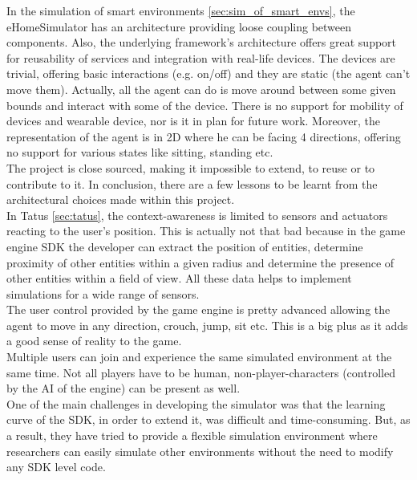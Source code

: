 In the simulation of smart environments \ref{sec:sim_of_smart_envs}, the eHomeSimulator has an architecture providing loose coupling between components. Also, the underlying framework's architecture offers great support for reusability of services and integration with real-life devices. The devices are trivial, offering basic interactions (e.g. on/off) and they are static (the agent can't move them). Actually, all the agent can do is move around between some given bounds and interact with some of the device. There is no support for mobility of devices and wearable device, nor is it in plan for future work. Moreover, the representation of the agent is in 2D where he can be facing 4 directions, offering no support for various states like sitting, standing etc.\\

The project is close sourced, making it impossible to extend, to reuse or to contribute to it. In conclusion, there are a few lessons to be learnt from the architectural choices made within this project.\\

In Tatus \ref{sec:tatus}, the context-awareness is limited to sensors and actuators reacting to the user's position. This is actually not that bad because in the game engine SDK the developer can extract the position of entities, determine proximity of other entities within a given radius and determine the presence of other entities within a field of view. All these data helps to implement simulations for a wide range of sensors.\\

The user control provided by the game engine is pretty advanced allowing the agent to move in any direction, crouch, jump, sit etc. This is a big plus as it adds a good sense of reality to the game.\\

Multiple users can join and experience the same simulated environment at the same time. Not all players have to be human, non-player-characters (controlled by the AI of the engine) can be present as well.\\

One of the main challenges in developing the simulator was that the learning curve of the SDK, in order to extend it, was difficult and time-consuming. But, as a result, they have tried to provide a flexible simulation environment where researchers can easily simulate other environments without the need to modify any SDK level code.\\

